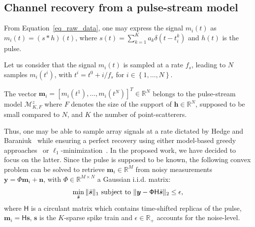 \documentclass{article}
\newcommand{\vect}[1]{\bm{#1}}
\newcommand{\mat}[1]{\mathsf{#1}}
\newcommand{\ser}[2]{#1^{#2}}
\theoremstyle{definition}
\begin{document}
\subsection{Channel recovery from a pulse-stream model}
\label{subsec_US_pulsestream}
From Equation~\eqref{eq_raw_data}, one may express the signal $m_i\left(t\right)$ as $m_i\left(t\right) = \left(s \ast h\right)\left(t\right)$, where $s \left(t\right) = \sum \limits_{k=1}^{K} a_k \delta\left(t - \ser{t_i}{k}\right)$ and $h\left(t\right)$ is the pulse. 

Let us consider that the signal $m_i \left(t\right)$ is sampled at a rate $f_s$, leading to $N$ samples $ m_i \left(\ser{t}{i}\right)$, with $\ser{t}{i}= \ser{t}{0} + i/f_s$ for $i \in \left\lbrace 1,\dots,N \right\rbrace$.

The vector $\vect{m}_i = \left[m_i\left(\ser{t}{1}\right),\dots,m_i\left(\ser{t}{N}\right)\right]^T \in \mathbb{R}^N$ belongs to the pulse-stream model $\mathcal{M}^z_{K,F}$ where $F$ denotes the size of the support of $\vect{h} \in \mathbb{R}^N$, supposed to be small compared to $N$, and $K$ the number of point-scatterers.

Thus, one may be able to sample array signals at a rate dictated by Hedge and Baraniuk~\cite{Hedge_TSP_2011} while ensuring a perfect recovery using either model-based greedy approaches~\cite{Baraniuk2010} or $\ell_1$-minimization~\cite{candes11}. 
In the proposed work, we have decided to focus on the latter. Since the pulse is supposed to be known, the following convex problem can be solved to retrieve $\vect{m}_i \in \mathbb{R}^M$ from noisy measurements $\vect{y} = \mathsf{\Phi} \vect{m}_i + \vect{n}$, with $\mathsf{\Phi} \in \mathbb{R}^{M \times N}$ a Gaussian i.i.d. matrix:
\begin{equation}
\label{eq_l1_BPDN}
\min_{\bar{\vect{s}}}\|\bar{\vect{s}}\|_{1}
\textnormal{ subject to }\| \bm{y}-\mat{\Phi H}\bar{\vect{s}}\|_{2}\leq\epsilon,
\end{equation}
where $\mat{H}$ is a circulant matrix which contains time-shifted replicas of the pulse, $\vect{m}_i = \mat{H} \vect{s}$, $\vect{s}$ is the $K$-sparse spike train and $\epsilon \in \mathbb{R}_{+}$ accounts for the noise-level.
\end{document}
